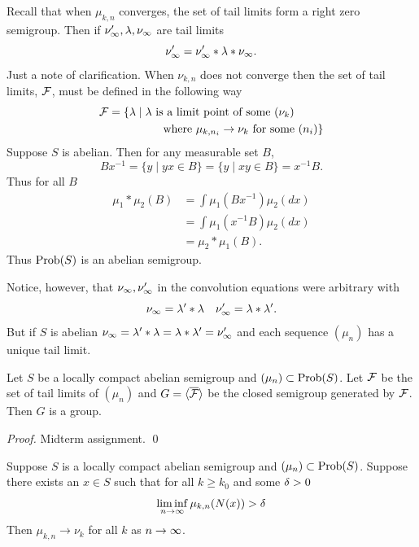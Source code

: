      Recall that when $\mu_{k,n}$ converges, the set of tail limits
form a right zero semigroup.  Then if $\nu'_\infty,\lambda,\nu_\infty$ are tail
limits
\[
     \nu'_\infty = \nu'_\infty * \lambda * \nu_\infty.
\]
Just a note of clarification.  When $\nu_{k,n}$ does not converge then
the set of tail limits, $\mathcal{F}$, must be defined in the following way
\[
\begin{aligned}
     \mathcal{F} = \{ \lambda \mid \lambda
               &\hbox{ is a limit point of some } (\nu_k)      \\
     &\quad \hbox{where } \mu_{k,n_i} \to \nu_k
               \hbox{ for some } (n_i) \}
\end{aligned}
\]
Suppose $S$ is abelian.  Then for any measurable set $B$,
\[
     Bx^{-1} = \{ y \mid yx \in B \} = \{ y \mid xy \in B \}
             = x^{-1}B.
\]
Thus for all $B$
\[
\begin{aligned}
       \mu_1 * \mu_2(B) &= \int \mu_1 (Bx^{-1}) \mu_2(dx)      \\
       &= \int \mu_1 (x^{-1} B) \mu_2(dx)                      \\
       &= \mu_2 * \mu_1(B).
\end{aligned}
\]
Thus $\hbox{Prob}(S)$ is an abelian semigroup.

     Notice, however, that $\nu_\infty,\nu'_\infty$ in the convolution
equations were arbitrary with
\[
     \nu_\infty = \lambda' * \lambda \quad \nu'_\infty = \lambda * \lambda'.
\]
But if $S$ is abelian $\nu_\infty = \lambda' * \lambda = \lambda * \lambda' = \nu'_\infty$ and each sequence $(\mu_n)$ has a unique tail limit.

\begin{theorem}		\label{thm:3.8}  
Let $S$ be a locally compact abelian semigroup and
$(\mu_n) \subset \hbox{Prob}(S)$.  Let $\mathcal{F}$ be the set of tail limits of
$(\mu_n)$ and $G = \langle \overline{\mathcal{F}} \rangle$ be the closed
semigroup generated by $\mathcal{F}$.  Then $G$ is a group.
\end{theorem}

\begin{proof}  Midterm assignment.
\qed
\end{proof}

\begin{theorem}		\label{thm:3.9}  
Suppose $S$ is a locally compact abelian semigroup and $(\mu_n) \subset \hbox{Prob}(S)$.  Suppose there exists an $x \in S$ such that for all $k \ge k_0$ and some $\delta > 0$
\[
     \liminf_{n \to \infty} \mu_{k,n} (N(x)) > \delta
\]
Then $\mu_{k,n} \to \nu_k$ for all $k$ as $n \to \infty$.
\end{theorem}


